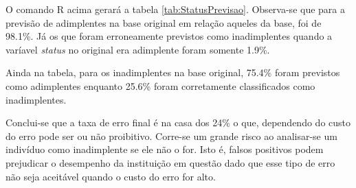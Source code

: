 O comando R acima gerará a tabela \ref{tab:StatusPrevisao}. Observa-se que para a previsão de adimplentes na base original em relação aqueles da base, foi de 98.1\%. Já os que foram erroneamente previstos como inadimplentes quando a varíavel \emph{status} no original era adimplente foram somente 1.9\%.

Ainda na tabela, para os inadimplentes na base original, 75.4\% foram previstos como adimplentes enquanto 25.6\% foram corretamente classificados como inadimplentes.

Conclui-se que a taxa de erro final é na casa dos 24\% o que, dependendo do custo do erro pode ser ou não proibitivo. Corre-se um grande risco ao analisar-se um indivíduo como inadimplente se ele não o for. Isto é, falsos positivos podem prejudicar o desempenho da instituição em questão dado que esse tipo de erro não seja aceitável quando o custo do erro for alto.
